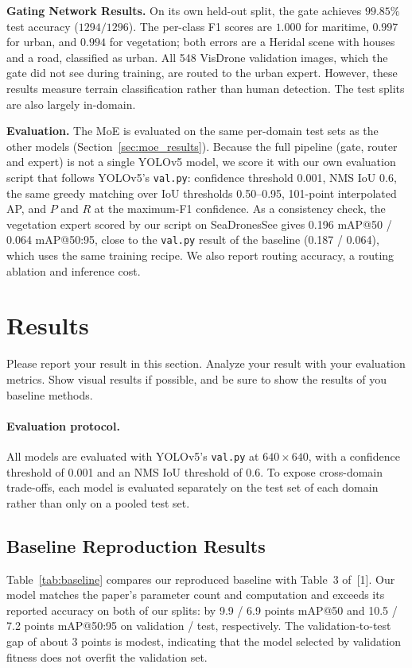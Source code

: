 \documentclass{article}
\begin{document}
\textbf{Gating Network Results.}
On its own held-out split, the gate achieves $99.85\%$ test accuracy ($1294/1296$). The per-class F1 scores are $1.000$ for maritime, $0.997$ for urban, and $0.994$ for vegetation; both errors are a Heridal scene with houses and a road, classified as urban. All 548 VisDrone validation images, which the gate did not see during training, are routed to the urban expert. However, these results measure terrain classification rather than human detection. The test splits are also largely in-domain.

\textbf{Evaluation.}
The MoE is evaluated on the same per-domain test sets as the other models (Section~\ref{sec:moe_results}). Because the full pipeline (gate, router and expert) is not a single YOLOv5 model, we score it with our own evaluation script that follows YOLOv5's \texttt{val.py}: confidence threshold 0.001, NMS IoU 0.6, the same greedy matching over IoU thresholds 0.50--0.95, 101-point interpolated AP, and $P$ and $R$ at the maximum-F1 confidence. As a consistency check, the vegetation expert scored by our script on SeaDronesSee gives 0.196 mAP@50 / 0.064 mAP@50:95, close to the \texttt{val.py} result of the baseline (0.187 / 0.064), which uses the same training recipe. We also report routing accuracy, a routing ablation and inference cost.


\section{Results}
Please report your result in this section. Analyze your result with your evaluation metrics. Show visual results if possible, and be sure to show the results of you baseline methods.

\paragraph{Evaluation protocol.} All models are evaluated with YOLOv5's \texttt{val.py} at $640\times640$, with a confidence threshold of 0.001 and an NMS IoU threshold of 0.6. To expose cross-domain trade-offs, each model is evaluated separately on the test set of each domain rather than only on a pooled test set.

\subsection{Baseline Reproduction Results}

Table~\ref{tab:baseline} compares our reproduced baseline with Table~3 of~[1]. Our model matches the paper's parameter count and computation and exceeds its reported accuracy on both of our splits: by 9.9 / 6.9 points mAP@50 and 10.5 / 7.2 points mAP@50:95 on validation / test, respectively. The validation-to-test gap of about 3 points is modest, indicating that the model selected by validation fitness does not overfit the validation set.
 
\end{document}
